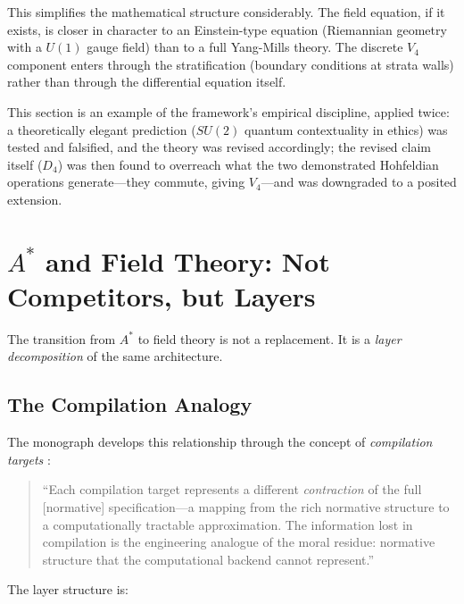 \documentclass[12pt]{article}
\theoremstyle{definition}
\theoremstyle{remark}
\begin{document}
This simplifies the mathematical structure considerably. The field equation, if it exists, is closer in character to an Einstein-type equation (Riemannian geometry with a $U(1)$ gauge field) than to a full Yang-Mills theory. The discrete $V_4$ component enters through the stratification (boundary conditions at strata walls) rather than through the differential equation itself.

This section is an example of the framework's empirical discipline, applied twice: a theoretically elegant prediction ($SU(2)$ quantum contextuality in ethics) was tested and falsified, and the theory was revised accordingly; the revised claim itself ($D_4$) was then found to overreach what the two demonstrated Hohfeldian operations generate---they commute, giving $V_4$---and was downgraded to a posited extension.


\section{$A^*$ and Field Theory: Not Competitors, but Layers}
\label{sec:layers}

The transition from $A^*$ to field theory is not a replacement. It is a \emph{layer decomposition} of the same architecture.

\subsection{The Compilation Analogy}

The monograph develops this relationship through the concept of \emph{compilation targets} \citep[Ch.~20]{anonymous2026ge}:

\begin{quote}
``Each compilation target represents a different \emph{contraction} of the full [normative] specification---a mapping from the rich normative structure to a computationally tractable approximation. The information lost in compilation is the engineering analogue of the moral residue: normative structure that the computational backend cannot represent.''
\end{quote}

The layer structure is:
\end{document}
